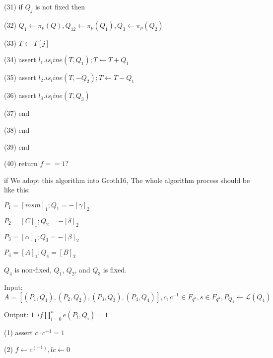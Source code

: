 (31) \indent \indent if $Q_j$ is not fixed then \newline

(32) \indent \indent \indent $\displaystyle Q_1 \leftarrow \pi_p(Q), Q_12\leftarrow \pi_p(Q_1), Q_3 \leftarrow \pi_p(Q_2) $ \newline

(33) \indent \indent \indent $\displaystyle T \leftarrow T[j] $ \newline

(34) \indent \indent \indent assert $\displaystyle l_1.is_line(T, Q_1); T \leftarrow T + Q_1 $ \newline

(35) \indent \indent \indent assert $\displaystyle l_2.is_line(T, -Q_2); T \leftarrow T - Q_1 $ \newline

(36) \indent \indent \indent assert $\displaystyle l_3.is_line(T, Q_3) $ \newline

(37) \indent \indent end \newline

(38) \indent end \newline

(39) end \newline

(40) return $\displaystyle f == 1? $ \newline

if We adopt this algorithm into Groth16, The whole algorithm process should be like this:

$\displaystyle P_1 = [msm]_1; Q_1 = -[\gamma]_2 $

$\displaystyle P_2 = [C]_1; Q_2 = -[\delta]_2 $

$\displaystyle P_3 = [\alpha]_1; Q_3 = -[\beta]_2 $

$\displaystyle P_4 = [A]_1; Q_4 = [B]_2 $

$Q_4$ is non-fixed, $Q_1$, $Q_2$, and $Q_3$ is fixed.

Input: $\displaystyle A = [(P_1,Q_1), (P_2,Q_2), (P_3,Q_3),(P_4,Q_4)],c, c^{-1} \in F_{q^k},s \in F_{q^3},P_{Q_4} \leftarrow \mathcal{L}(Q_4)$ \newline

Output: $\displaystyle 1 \ \ if \prod_{i=0}^{n}e(P_i, Q_i) = 1 $ \newline

(1) assert $\displaystyle c \cdot c^{-1} = 1 $ \newline

(2) $\displaystyle f \leftarrow c^(-1), lc \leftarrow 0 $ \newline

